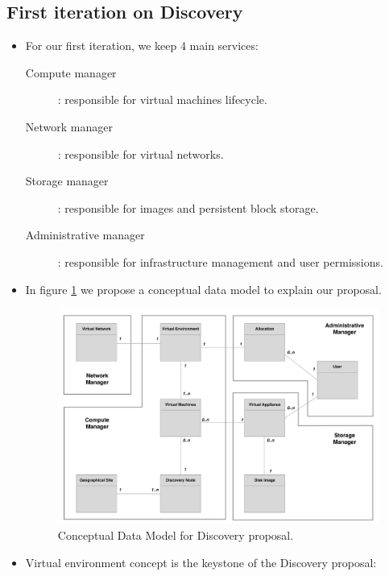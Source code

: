 \subsection{First iteration on Discovery}

\begin{itemize}

	\item For our first iteration, we keep 4 main services:
		\begin{description}

			\item [Compute manager] : responsible for virtual machines lifecycle.

			\item [Network manager] : responsible for virtual networks.

			\item [Storage manager] : responsible for images and persistent block storage.

			\item [Administrative manager] : responsible for infrastructure management and user permissions.  

		\end{description}


	\item In figure \ref{fig:mcd} we propose a conceptual data model to explain our proposal.


	\begin{figure}
		\centering
		\includegraphics[width=0.91\linewidth]{Figures/mcd_3.pdf}
		\caption{Conceptual Data Model for Discovery proposal.}%
		\label{fig:mcd}%
	\end{figure}

	\item Virtual environment concept is the keystone of the Discovery proposal:
		

\end{itemize}
